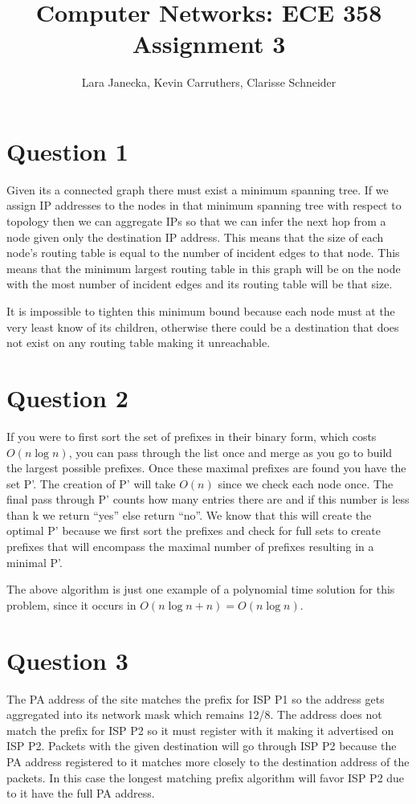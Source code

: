 \documentclass[12pt]{article}
\begin{document}
\title{Computer Networks: ECE 358 Assignment 3}
\date{Lara Janecka, Kevin Carruthers, Clarisse Schneider}
\maketitle

\section*{Question 1} %
\label{sec:question_1}
Given its a connected graph there must exist a minimum spanning tree. If we assign IP addresses to the nodes in that minimum spanning tree with respect to topology then we can aggregate IPs so that we can infer the next hop from a node given only the destination IP address. This means that the size of each node's routing table is equal to the number of incident edges to that node. This means that the minimum largest routing table in this graph will be on the node with the most number of incident edges and its routing table will be that size.

It is impossible to tighten this minimum bound because each node must at the very least know of its children, otherwise there could be a destination that does not exist on any routing table making it unreachable.




\section*{Question 2} %
\label{sec:question_2}
If you were to first sort the set of prefixes in their binary form, which costs $O(n\log n)$, you can pass through the list once and merge as you go to build the largest possible prefixes. Once these maximal prefixes are found you have the set P'. The creation of P' will take $O(n)$ since we check each node once. The final pass through P' counts how many entries there are and if this number is less than k we return ``yes'' else return ``no''. We know that this will create the optimal P' because we first sort the prefixes and check for full sets to create prefixes that will encompass the maximal number of prefixes resulting in a minimal P'.

The above algorithm is just one example of a polynomial time solution for this problem, since it occurs in $O(n\log n + n) = O(n \log n)$. 


\section*{Question 3} %
\label{sec:question_3}
The PA address of the site matches the prefix for ISP P1 so the address gets aggregated into its network mask which remains 12/8. The address does not match the prefix for ISP P2 so it must register with it making it advertised on ISP P2. Packets with the given destination will go through ISP P2 because the PA address registered to it matches more closely to the destination address of the packets. In this case the longest matching prefix algorithm will favor ISP P2 due to it have the full PA address.
\end{document}
